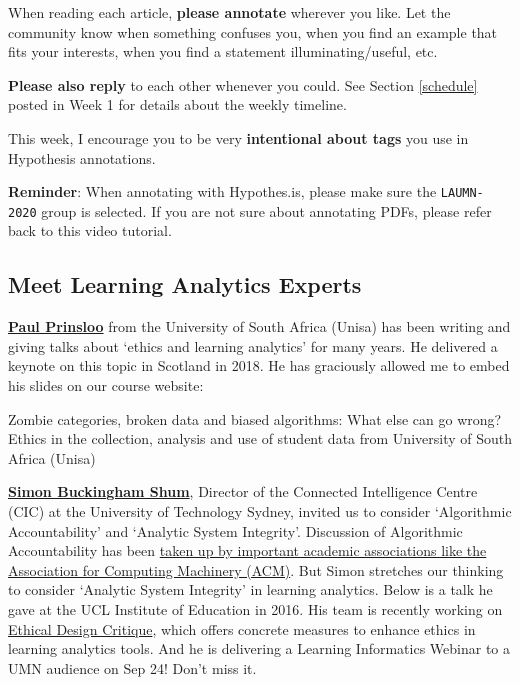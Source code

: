 \documentclass[
]{book}
\begin{document}
When reading each article, \textbf{please annotate} wherever you like. Let the community know when something confuses you, when you find an example that fits your interests, when you find a statement illuminating/useful, etc.

\textbf{Please also reply} to each other whenever you could. See Section \ref{schedule} posted in Week 1 for details about the weekly timeline.

This week, I encourage you to be very \textbf{intentional about tags} you use in Hypothesis annotations.

\textbf{Reminder}: When annotating with Hypothes.is, please make sure the \texttt{LAUMN-2020} group is selected. If you are not sure about annotating PDFs, please refer back to this video tutorial.

\hypertarget{meet-learning-analytics-experts}{%
\subsection{Meet Learning Analytics Experts}\label{meet-learning-analytics-experts}}

\textbf{\href{https://opendistanceteachingandlearning.wordpress.com/about/}{Paul Prinsloo}} from the University of South Africa (Unisa) has been writing and giving talks about `ethics and learning analytics' for many years. He delivered a keynote on this topic in Scotland in 2018. He has graciously allowed me to embed his slides on our course website:

Zombie categories, broken data and biased algorithms: What else can go wrong? Ethics in the collection, analysis and use of student data from University of South Africa (Unisa)

\textbf{\href{http://simon.buckinghamshum.net/}{Simon Buckingham Shum}}, Director of the Connected Intelligence Centre (CIC) at the University of Technology Sydney, invited us to consider `Algorithmic Accountability' and `Analytic System Integrity'. Discussion of Algorithmic Accountability has been \href{https://www.acm.org/binaries/content/assets/public-policy/2017_usacm_statement_algorithms.pdf}{taken up by important academic associations like the Association for Computing Machinery (ACM)}. But Simon stretches our thinking to consider `Analytic System Integrity' in learning analytics. Below is a talk he gave at the UCL Institute of Education in 2016. His team is recently working on \href{http://simon.buckinghamshum.net/2018/08/ethical-design-critique/}{Ethical Design Critique}, which offers concrete measures to enhance ethics in learning analytics tools. And he is delivering a Learning Informatics Webinar to a UMN audience on Sep 24! Don't miss it.
\end{document}
